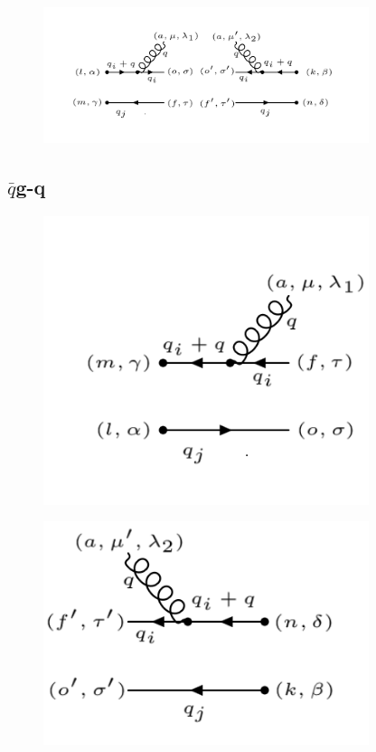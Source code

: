 \begin{figure}[h!]
\centering
\includegraphics[width=0.85\textwidth]{images/qgqbarMSquer.png}
\end{figure}
\newpage

\subsection{$\bar{q}$g-q}

\begin{figure}[h!]
\centering
\includegraphics[width=0.85\textwidth]{images/qbargqM.png}
\end{figure}


\begin{figure}[h!]
\centering
\includegraphics[width=0.85\textwidth]{images/qbargqMDega.png}
\end{figure}


